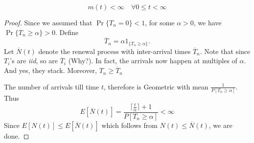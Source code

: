 \documentclass[a4paper,10pt]{article}
\begin{document}
\begin{prop}
\begin{equation*} 
m(t) < \infty \quad \forall 0 \leq t < \infty
\end{equation*}
\end{prop}
\begin{proof}
Since we assumed that $\Pr\{T_n = 0\} < 1$, for some $\alpha > 0$, we have $\Pr\{T_n \geq \alpha\} >0$. Define
\begin{equation*}
\overline{T}_n = \alpha 1_{\{T_n \geq \alpha\}}.
\end{equation*}
Let $\overline{N}(t)$ denote the renewal process with inter-arrival times $\overline{T}_n$. Note that since $T_i$'s are \emph{iid}, so are $\overline{T}_i$ (Why?). In fact, the arrivals now happen at multiples of $\alpha$. And yes, they stack. Moreover, $T_n \geq \overline{T}_n$

The number of arrivals till time $t$, therefore is Geometric with mean $\frac{1}{P[T_n \geq \alpha]}$. Thus 
\begin{equation*}
E[\overline{N}(t)] = \frac{\lceil\frac{t}{\alpha} \rceil + 1}{P[T_n \geq \alpha]} < \infty
\end{equation*}
Since $E[N(t)] \leq E[\overline{N}(t)]$ which follows from $N(t) \leq \overline{N}(t)$, we are done.
\end{proof}
\end{document}
